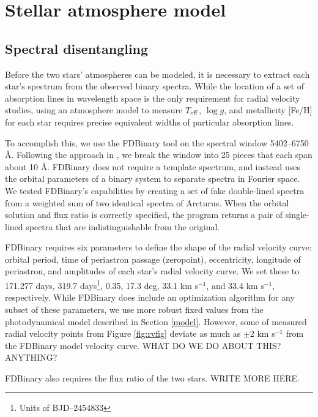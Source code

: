 \section{Stellar atmosphere model}\label{atm}

\subsection{Spectral disentangling}\label{disentangle}
Before the two stars' atmospheres can be modeled, it is necessary to extract each star's spectrum from the observed binary spectra. While the location of a set of absorption lines in wavelength space is the only requirement for radial velocity studies, using an atmosphere model to measure $T_{\rm{eff}}$, $\log g$, and metallicity [Fe/H] for each star requires precise equivalent widths of particular absorption lines.

To accomplish this, we use the FDBinary tool \citep{ili04} on the spectral window 5402--6750 \AA. Following the approach in \citet{bec14}, we break the window into 25 pieces that each span about 10 \AA. FDBinary does not require a template spectrum, and instead uses the orbital parameters of a binary system to separate spectra in Fourier space. We tested FDBinary's capabilities by creating a set of fake double-lined spectra from a weighted sum of two identical spectra of Arcturus. When the orbital solution and flux ratio is correctly specified, the program returns a pair of single-lined spectra that are indistinguishable from the original.

FDBinary requires six parameters to define the shape of the radial velocity curve: orbital period, time of periastron passage (zeropoint), eccentricity, longitude of periastron, and amplitudes of each star's radial velocity curve. We set these to 171.277 days, 319.7 days\footnote{Units of BJD--2454833}, 0.35, 17.3 deg, 33.1 km s$^{-1}$, and 33.4 km s$^{-1}$, respectively. While FDBinary does include an optimization algorithm for any subset of these parameters, we use more robust fixed values from the photodynamical model described in Section \ref{model}. However, some of measured radial velocity points from Figure \ref{fig:rvfig} deviate as much as $\pm 2$ km s$^{-1}$ from the FDBinary model velocity curve. WHAT DO WE DO ABOUT THIS? ANYTHING?

FDBinary also requires the flux ratio of the two stars. WRITE MORE HERE.

